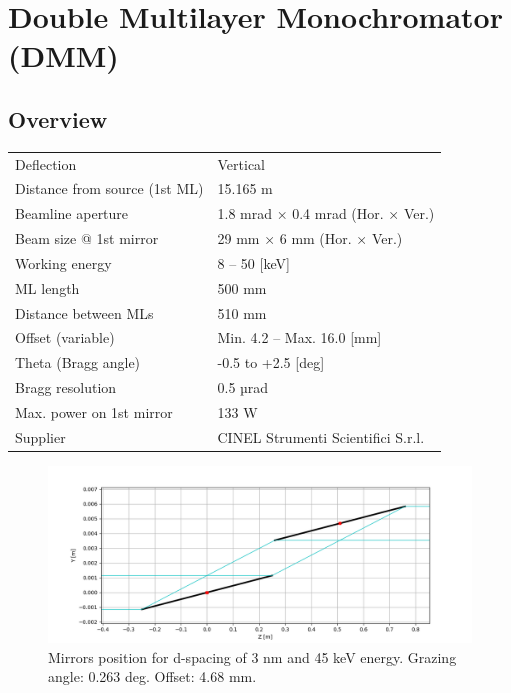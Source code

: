 \section{Double Multilayer Monochromator (DMM)}
\subsection{Overview}

\begin{center}
\begin{table}
\begin{tabular}[bhp]{|p{} | p{}|}
\hline
Deflection & Vertical \\
Distance from source (1st ML) & 15.165 m \\
Beamline aperture & 1.8 mrad × 0.4 mrad (Hor. × Ver.) \\
Beam size @ 1st mirror & 29 mm × 6 mm (Hor. × Ver.) \\
Working energy & 8 – 50 [keV] \\
ML length & 500 mm \\
Distance between MLs & 510 mm \\
Offset (variable) & Min. 4.2 – Max. 16.0 [mm] \\
Theta (Bragg angle) & -0.5 to +2.5 [deg] \\
Bragg resolution & 0.5 µrad \\
Max. power on 1st mirror & 133 W \\
Supplier & CINEL Strumenti Scientifici S.r.l. \\
\hline
\end{tabular}
\label{tab:DMM_general}
\end{table}
\end{center}

\begin{figure}[ht]
\centering
\includegraphics[width=1.0\textwidth]{./../figures/operation/DMM_mirrors_d3_E45_gr0.263_offset4.68.png}
\caption{\label{fig:DMM_mirrors_45keV} Mirrors position for d-spacing of 3 nm and 45 keV energy. Grazing angle: 0.263 deg. Offset: 4.68 mm.}
\end{figure}

